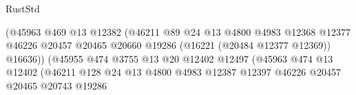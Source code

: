 \begin{lexlean}{RustStd}
\begin{coremodule}
                                                  (@45963
                                                    @469
                                                    @13
                                                    @12382
                                                    (@46211
                                                      @89
                                                      @24
                                                      @13
                                                      @4800
                                                      @4983
                                                      @12368
                                                      @12377
                                                      @46226
                                                      @20457
                                                      @20465
                                                      @20660
                                                      @19286
                                                      (@16221 (@20484 @12377 @12369))
                                                      @16636))
                                                  (@45955
                                                    @474
                                                    @3755
                                                    @13
                                                    @20
                                                    @12402
                                                    @12497
                                                    (@45963
                                                      @474
                                                      @13
                                                      @12402
                                                      (@46211
                                                        @128
                                                        @24
                                                        @13
                                                        @4800
                                                        @4983
                                                        @12387
                                                        @12397
                                                        @46226
                                                        @20457
                                                        @20465
                                                        @20743
                                                        @19286

\end{coremodule}
\end{lexlean}
